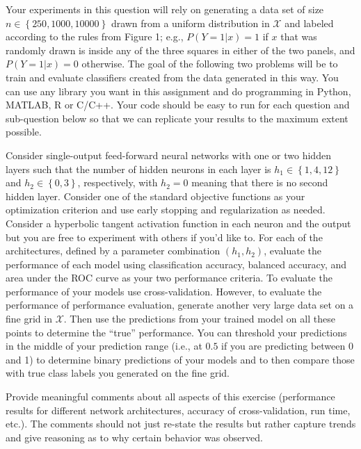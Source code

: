 \documentclass[twoside]{article}
\begin{document}
Your experiments in this question will rely on generating a data set of size $n\in\left\{250, 1000, 10000\right\}$ drawn from a uniform distribution in $\mathcal{X}$ and labeled according to the rules from Figure 1; e.g., $P(Y=1|x)=1$ if $x$ that was randomly drawn is inside any of the three squares in either of the two panels, and $P(Y=1|x)=0$ otherwise. The goal of the following two problems will be to train and evaluate classifiers created from the data generated in this way. You can use any library you want in this assignment and do programming in Python, MATLAB, R or C/C++. Your code should be easy to run for each question and sub-question below so that we can replicate your results to the maximum extent possible.

Consider single-output feed-forward neural networks with one or two hidden layers such that the number of hidden neurons in each layer is $h_1\in\left\{1, 4, 12\right\}$ and $h_2\in\left\{0, 3\right\}$, respectively, with $h_2=0$ meaning that there is no second hidden layer. Consider one of the standard objective functions as your optimization criterion and use early stopping and regularization as needed. Consider a hyperbolic tangent activation function in each neuron and the output but you are free to experiment with others if you'd like to. For each of the architectures, defined by a parameter combination $(h_1,h_2)$, evaluate the performance of each model using classification accuracy, balanced accuracy, and area under the ROC curve as your two performance criteria. To evaluate the performance of your models use cross-validation. However, to evaluate the performance of performance evaluation, generate another very large data set on a fine grid in $\mathcal{X}$. Then use the predictions from your trained model on all these points to determine the ``true'' performance. You can threshold your predictions in the middle of your prediction range (i.e., at $0.5$ if you are predicting between 0 and 1) to determine binary predictions of your models and to then compare those with true class labels you generated on the fine grid. 

Provide meaningful comments about all aspects of this exercise (performance results for different network architectures, accuracy of cross-validation, run time, etc.). The comments should not just re-state the results but rather capture trends and give reasoning as to why certain behavior was observed.
\end{document}
